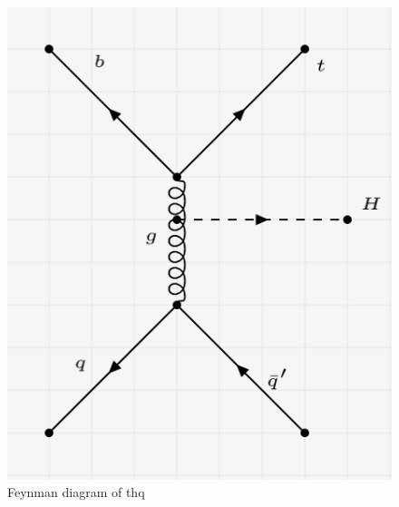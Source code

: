 \begin{figure}[H]
    \centering
    \includegraphics[scale =1]{figure_1/thq.png}
    \caption{Feynman diagram of thq}
    \label{fig:my_label_thq}
\end{figure}




